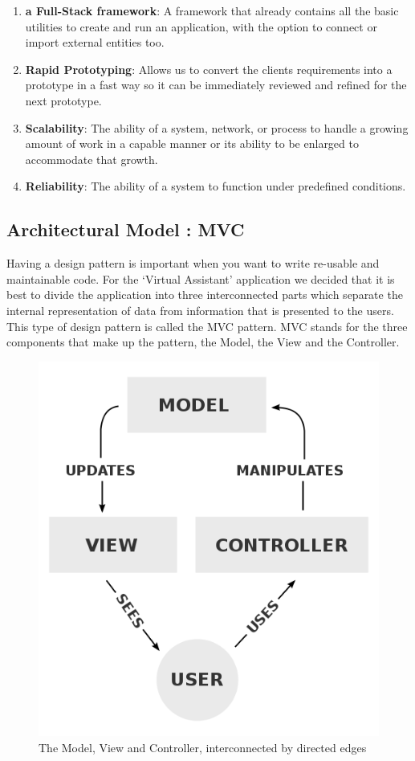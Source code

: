 \begin{enumerate}
	\item \textbf{a Full-Stack framework}: A framework that already contains all the basic utilities to create and run an application, with the option to connect or import external entities too.
	\item \textbf{Rapid Prototyping}: Allows us to convert the clients requirements into a prototype in a fast way so it can be immediately reviewed and refined for the next prototype.
	\item \textbf{Scalability}: The ability of a system, network, or process to handle a growing amount of work in a capable manner or its ability to be enlarged to accommodate that growth.\cite{wiki:scalability}
	\item \textbf{Reliability}: The ability of a system to function under predefined conditions.
\end{enumerate}

\subsection{Architectural Model : MVC}
Having a design pattern is important when you want to write re-usable and maintainable code.
For the `Virtual Assistant' application we decided that it is best to divide the application into three interconnected parts which separate the internal representation of data from information that is presented to the users\cite{wiki:mvc}. This type of design pattern is called the MVC pattern. MVC stands for the three components that make up the pattern, the Model, the View and the Controller.
\begin{figure}[h]
\centering
\includegraphics[scale=0.3]{./img/MVC.png}
\caption{\small{The Model, View and Controller, interconnected by directed edges}}
\label{mvc}
	
\end{figure}

